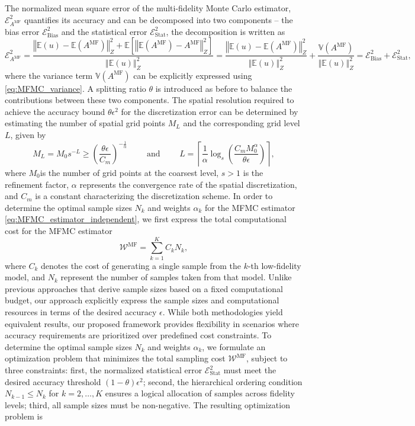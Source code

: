 %
The normalized mean square error of the multi-fidelity Monte Carlo estimator, $\mathcal{E}_{A^{\text{MF}}}^2$ quantifies its accuracy and can be decomposed into two components -- the bias error $\mathcal{E}_{\text{Bias}}^2$ and the statistical error $\mathcal{E}_{\text{Stat}}^2$, the decomposition is written as 
%
\[
\mathcal{E}_{A^{\text{MF}}}^2= \frac{\left\Vert\mathbb{E}(u)-\mathbb{E}(A^{\text{MF}}) \right\Vert_{Z}^2+\mathbb E\left[\left\Vert\mathbb{E}(A^{\text{MF}})-A^{\text{MF}} \right\Vert_{Z}^2\right]}{\left\Vert\mathbb{E}(u) \right\Vert_{Z}^2} =\frac{\left\Vert\mathbb{E}(u)-\mathbb{E}(A^{\text{MF}}) \right\Vert_{Z}^2}{\left\Vert\mathbb{E}(u) \right\Vert_{Z}^2}+ \frac{\mathbb{V}\left(A^{\text{MF}}\right)}{\left\Vert\mathbb{E}(u) \right\Vert_{Z}^2}=\mathcal{E}_{\text{Bias}}^2 + \mathcal{E}_{\text{Stat}}^2,
\]
%
where the variance term $\mathbb{V}\left(A^{\text{MF}}\right)$  can be explicitly expressed using \eqref{eq:MFMC_variance}. A splitting ratio $\theta$ is introduced as before to balance the contributions between these two components. The spatial resolution required to achieve the accuracy bound $\theta \epsilon^2$ for the discretization error can be determined by estimating the number of spatial grid points $M_L$ and the corresponding grid level $L$, given by
%
\begin{equation}
    \label{eq:SLSGC_MLS_SpatialGridsNo}
    M_L = M_0s^{-L} \ge \left(\frac{\theta\epsilon}{C_m}\right)^{-\frac 1 {\alpha}} \qquad \text{ and } \qquad     L = \left\lceil \frac{1}{\alpha}\log_s \left(\frac{C_m M_0^\alpha}{\theta\epsilon}\right) \right\rceil,
\end{equation}
%
where $M_0$is the number of grid points at the coarsest level, $s>1$ is the refinement factor, $\alpha$ represents the convergence rate of the spatial discretization, and $C_m$ is a constant characterizing the discretization scheme. In order to determine the optimal sample sizes $N_k$ and weights $\alpha_k$ for the MFMC estimator \eqref{eq:MFMC_estimator_independent}, we first express the total computational cost for the MFMC estimator
%
\[
\mathcal{W}^{\text{MF}} = \sum_{k=1}^K C_kN_k,
\]
%
where $C_k$ denotes the cost of generating a single sample from the $k$-th low-fidelity model, and $N_k$ represent the number of samples taken from that model. Unlike previous approaches \cite{PeWiGu:2016} that derive sample sizes based on a fixed computational budget, our approach explicitly express the sample sizes and computational resources in terms of the desired accuracy $\epsilon$. While both methodologies yield equivalent results, our proposed framework provides flexibility in scenarios where accuracy requirements are prioritized over predefined cost constraints. To determine the optimal sample sizes $N_k$ and weights $\alpha_k$,  we formulate an optimization problem that minimizes the total sampling cost $\mathcal{W}^{\text{MF}}$, subject to three constraints: first, the normalized statistical error $\mathcal{E}_{\text{Stat}}^2$ must meet the desired accuracy threshold $(1-\theta)\epsilon^2$; second,  the hierarchical ordering condition $N_{k-1}\le N_k$ for $k=2,\ldots, K$ ensures a logical allocation of samples across fidelity levels; third, all sample sizes must be non-negative. The resulting optimization problem is
